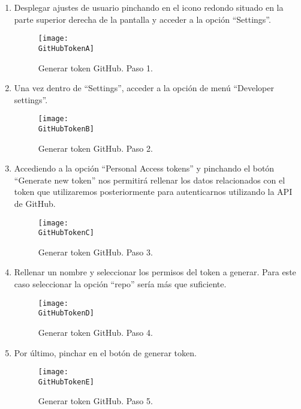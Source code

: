 \begin{enumerate}
    \item Desplegar ajustes de usuario pinchando en el icono redondo situado en la parte superior derecha de la pantalla y acceder a la opción ``Settings''.

    \begin{figure}[h]
        \centering
        \texttt{[image: \\GitHubTokenA]}
        \caption{Generar token GitHub. Paso 1.}
    \end{figure}

    \item Una vez dentro de “Settings”, acceder a la opción de menú ``Developer settings''.

    \begin{figure}[h]
        \centering
        \texttt{[image: \\GitHubTokenB]}
        \caption{Generar token GitHub. Paso 2.}
    \end{figure}

    \item Accediendo a la opción ``Personal Access tokens'' y pinchando el botón ``Generate new token'' nos permitirá rellenar los datos relacionados con el token que utilizaremos posteriormente para autenticarnos utilizando la API de GitHub.
    
    \begin{figure}[h]
        \centering
        \texttt{[image: \\GitHubTokenC]}
        \caption{Generar token GitHub. Paso 3.}
    \end{figure}

    \item Rellenar un nombre y seleccionar los permisos del token a generar. Para este caso seleccionar la opción ``repo'' sería más que suficiente.
    
    \begin{figure}[h]
        \centering
        \texttt{[image: \\GitHubTokenD]}
        \caption{Generar token GitHub. Paso 4.}
    \end{figure}

    \item Por último, pinchar en el botón de generar token.

    \begin{figure}[h]
        \centering
        \texttt{[image: \\GitHubTokenE]}
        \caption{Generar token GitHub. Paso 5.}
    \end{figure}

\end{enumerate}